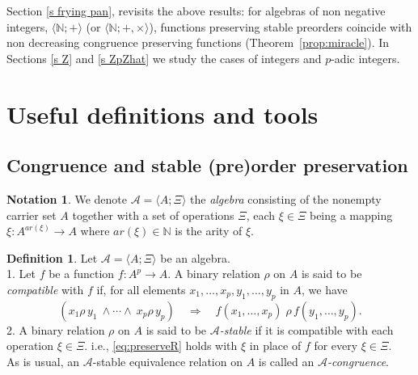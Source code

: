 \documentclass[11pt,a4paper]{article}
\theoremstyle{definition} %
\newtheorem{definition}[theorem]{Definition}
\newtheorem{notation}[theorem]{Notation}
\newcommand\+[1]{\mathcal{#1}} %
\newcommand{\N}{{\mathbb N}}     %
\begin{document}
Section \ref{s frying pan}, 
revisits the above results: for algebras of non negative integers,  $\langle\N;+\rangle$ (or $\langle\N;+,\times\rangle$), functions preserving stable preorders  coincide with non decreasing congruence preserving functions (Theorem~\ref{prop:miracle}).  In Sections \ref{s Z} and \ref{s ZpZhat} we study the cases of integers  and $p$-adic integers. 
  

\section{Useful definitions and tools}\label{s:def}


%
\subsection{Congruence  and stable (pre)order preservation}
\label{ss cong stable preorder}
%
\begin{notation} We denote $\+A=\langle A;\Xi\rangle$ the {\em algebra}
consisting of the nonempty carrier set $A$ together with a set of operations $\Xi$, each $\xi\in\Xi$ being  a mapping $\xi\colon A^{ar(\xi)}\to A$ where $ar(\xi)\in\N$ is the arity of $\xi$.
\end{notation}
%
\begin{definition}\label{def:fpreserveR}
Let  $\+A=\langle A;\Xi\rangle$ be an algebra.
\\
1. Let $f$ be a function $f\colon A^p\longrightarrow A$. 
A binary relation $\rho$ on  $A$ 
is said to be {\em compatible} with $f$ if, 
for all elements $x_1,\ldots,x_{p}, y_1,\ldots,y_{p}$ in $A$,
we have
\begin{equation}\label{eq:preserveR}
(x_1\rho\, y_1\ \wedge\cdots\wedge\ x_{p}\rho\, y_{p})\quad
  \Longrightarrow \quad f(x_1,\ldots,x_p)\;\rho\, f(y_1,\ldots,y_p).
\end{equation}  
%
2. A  binary relation $\rho$ on  $A$ is said to be {\em $\+A$-stable}  
 if it is compatible with each  operation $\xi\in\Xi$.
 i.e., \eqref{eq:preserveR} holds with $\xi$ in place of $f$ for every $\xi\in\Xi$.
\\
As is usual, an $\+A$-stable equivalence relation on $A$ 
is  called an {\em $\+A$-congruence}. 
\end{definition} 
%
\end{document}
